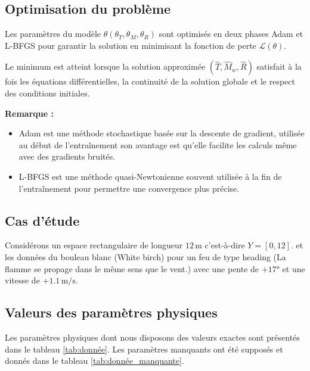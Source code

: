 \documentclass[12pt, oneside]{report} %
\theoremstyle{definition}
\theoremstyle{remark}
\newtheorem*{rem}{\textbf{Remarque : }}
\begin{document}
		
		\subsection{ Optimisation du problème} 
		Les paramètres du modèle  $\theta\left( \theta_T, \theta_M, \theta_R \right)$ sont optimisés en deux phases Adam et L-BFGS pour garantir la solution en minimisant la fonction de perte $\mathcal{L}(\theta)$.\
		
		Le minimum est atteint lorsque la solution approximée $(\hat{T}, \hat{M}_w, \hat{R})$ satisfait à la fois les équations différentielles, la continuité de la solution globale et le respect des conditions initiales. 
		
		
	
	\textbf{Remarque : }
			\begin{itemize}
			\item Adam est une méthode stochastique basée sur la descente de gradient, utilisée au début de l'entraînement son avantage est qu'elle facilite les calculs même avec des gradients bruités.
			\item L-BFGS est une méthode quasi-Newtonienne souvent utilisée à la fin de l'entraînement pour permettre une convergence plus précise.
			\end{itemize}
			
			\subsection{Cas d'étude}
			Considérons un espace rectangulaire de longueur $12\, \mathrm{m}$ c'est-à-dire $Y = [0, 12]$. et les données du bouleau blanc (White birch) pour un feu de type heading (La flamme se propage dans le même sens que le vent.) avec une pente de $+17°$ et une vitesse de $+1.1\,\mathrm{m/s}$. 
			
			\subsection{Valeurs des paramètres physiques}
			Les paramètres physiques dont nous disposons des valeurs exactes sont présentés dans le tableau \eqref{tab:donnée}. Les paramètres manquants ont été supposés et donnés dans le tableau \eqref{tab:donnée_manquante}.
			
\end{document}
